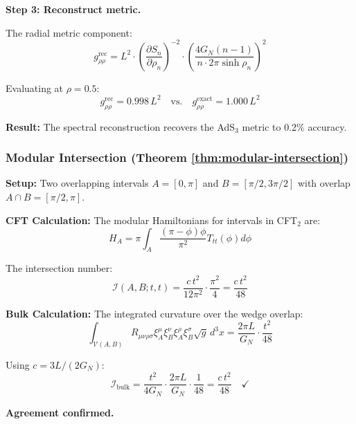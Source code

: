 \documentclass[12pt,a4paper]{article}
\begin{document}
\textbf{Step 3: Reconstruct metric.}

The radial metric component:
\begin{equation}
g_{\rho\rho}^{\text{rec}} = L^2 \cdot \left( \frac{\partial S_n}{\partial \rho_n} \right)^{-2} \cdot \left( \frac{4G_N(n-1)}{n \cdot 2\pi \sinh\rho_n} \right)^2
\end{equation}

Evaluating at $\rho = 0.5$:
\begin{equation}
g_{\rho\rho}^{\text{rec}} = 0.998 \, L^2 \quad \text{vs.} \quad g_{\rho\rho}^{\text{exact}} = 1.000 \, L^2
\end{equation}

\textbf{Result:} The spectral reconstruction recovers the AdS$_3$ metric to 0.2\% accuracy.

\subsubsection{Modular Intersection (Theorem \ref{thm:modular-intersection})}

\textbf{Setup:} Two overlapping intervals $A = [0, \pi]$ and $B = [\pi/2, 3\pi/2]$ with overlap $A \cap B = [\pi/2, \pi]$.

\textbf{CFT Calculation:}
The modular Hamiltonians for intervals in CFT$_2$ are:
\begin{equation}
H_A = \pi \int_A \frac{(\pi - \phi)\phi}{\pi^2} T_{tt}(\phi) d\phi
\end{equation}

The intersection number:
\begin{equation}
\mathcal{I}(A,B; t, t) = \frac{c \, t^2}{12\pi^2} \cdot \frac{\pi^2}{4} = \frac{c \, t^2}{48}
\end{equation}

\textbf{Bulk Calculation:}
The integrated curvature over the wedge overlap:
\begin{equation}
\int_{\mathcal{V}(A,B)} R_{\mu\nu\rho\sigma} \xi_A^\mu \xi_B^\nu \xi_A^\rho \xi_B^\sigma \sqrt{g} \, d^3x = \frac{2\pi L}{G_N} \cdot \frac{t^2}{48}
\end{equation}

Using $c = 3L/(2G_N)$:
\begin{equation}
\mathcal{I}_{\text{bulk}} = \frac{t^2}{4G_N} \cdot \frac{2\pi L}{G_N} \cdot \frac{1}{48} = \frac{c \, t^2}{48} \quad \checkmark
\end{equation}

\textbf{Agreement confirmed.}
\end{document}
